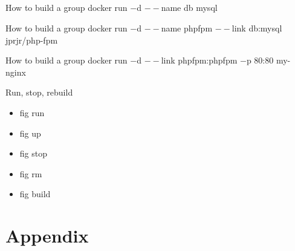 \documentclass{beamer}
\begin{document}
    \subsection{}
    \begin{frame}{How to build a group}
        docker run $-$d $--$name db mysql\\
        \lstFigYmlMysql
    \end{frame}
    \begin{frame}{How to build a group}
        docker run $-$d $--$name phpfpm $--$link db:mysql jprjr/php-fpm\\
        \lstFigYmlPhpFpm
    \end{frame}
    \begin{frame}{How to build a group}
        docker run $-$d $--$link phpfpm:phpfpm $-$p 80:80 my-nginx\\
        \lstFigYmlNginx
    \end{frame}
    \begin{frame}{Run, stop, rebuild}
        \begin{itemize}
            \item fig run
            \item fig up
            \item fig stop
            \item fig rm
            \item fig build
        \end{itemize}
    \end{frame}
    \section{Appendix}
\end{document}

